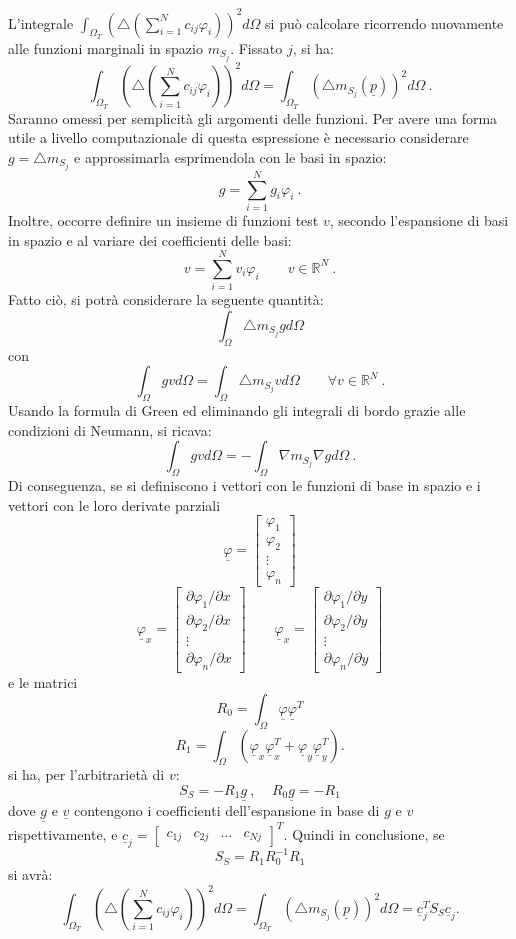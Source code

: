 \documentclass[a4paper,11pt,twoside,openright]{book}							%
\begin{document}
L'integrale $\int_{\Omega_T} ( \triangle(\sum_{i=1}^N  c_{ij}\varphi_i ) )^2 d \Omega$ si può calcolare ricorrendo nuovamente alle funzioni marginali in spazio $m_{S_j}$. Fissato $j$, si ha:
$$
\int_{\Omega_T} ( \triangle(\sum_{i=1}^N  c_{ij}\varphi_i ) )^2 d \Omega = \int_{\Omega_T} (\triangle m_{S_j}(\underline p))^2 d \Omega \ .
$$
Saranno omessi per semplicità gli argomenti delle funzioni. Per avere una forma utile a livello computazionale di questa espressione è necessario considerare $ g = \triangle m_{S_j} $ e approssimarla esprimendola con le basi in spazio:
$$
g=\sum_{i=1}^N  g_i\varphi_i \ .
$$
Inoltre, occorre definire un insieme di funzioni test $v$, secondo l'espansione di basi in spazio e al variare dei coefficienti delle basi:
$$
v=\sum_{i=1}^N  v_i\varphi_i \qquad v \in \mathbb{R}^N \ .
$$
Fatto ciò, si potrà considerare la seguente quantità:
$$
\int_\Omega \triangle m_{S_j} g d \Omega
$$
con
$$
\int_\Omega g v d \Omega= \int_\Omega \triangle m_{S_j} v d \Omega\qquad \forall v \in \mathbb{R}^N \ .
$$
Usando la formula di Green ed eliminando gli integrali di bordo grazie alle condizioni di Neumann, si ricava:
$$
\int_\Omega g v d \Omega= -\int_\Omega \nabla m_{S_j} \nabla g d \Omega \ .
$$
Di conseguenza, se si definiscono i vettori con le funzioni di base in spazio e i vettori con le loro derivate parziali
$$
\underline \varphi =
\begin{bmatrix}
\varphi_{1}  \\
\varphi_{2}  \\
\vdots\\
\varphi_{n}
\end{bmatrix}
$$
\begin{equation}
\underline \varphi_x=  \begin{bmatrix}
\partial \varphi_{1}/\partial x \\
\partial \varphi_{2}/\partial x  \\
\vdots\\
\partial \varphi_{n}/\partial x \end{bmatrix} 
\qquad
\underline \varphi_x=  \begin{bmatrix}
\partial \varphi_{1}/\partial y  \\
\partial \varphi_{2}/\partial y  \\
\vdots\\
\partial \varphi_{n}/\partial y\end{bmatrix} 
\end{equation}
e le matrici
$$ R_0 = \int_\Omega \underline \varphi \underline \varphi^T $$
$$ R_1 = \int_\Omega (\underline \varphi_x \underline \varphi_x^T + \underline \varphi_y \underline \varphi_y^T). $$
si ha, per l'arbitrarietà di $v$: 
$$ S_S= - R_1 \underline g \ , \ \ \ \ \ R_0 \underline g = - R_1  $$
dove $\underline g$ e $\underline v$ contengono i coefficienti dell'espansione in base di $g$ e $v$ rispettivamente, e $\underline c_j =
\begin{bmatrix}
c_{1j} & c_{2j} & \hdots & c_{Nj}
\end{bmatrix}^T$.
Quindi in conclusione, se 
$$
S_S = R_1 R_0^{-1} R_1
$$
si avrà:
$$
\int_{\Omega_T} ( \triangle(\sum_{i=1}^N  c_{ij}\varphi_i ) )^2 d \Omega = \int_{\Omega_T} (\triangle m_{S_j}(\underline p))^2 d \Omega  =\underline c^T_j S_S \underline c_j .
$$
\end{document}
